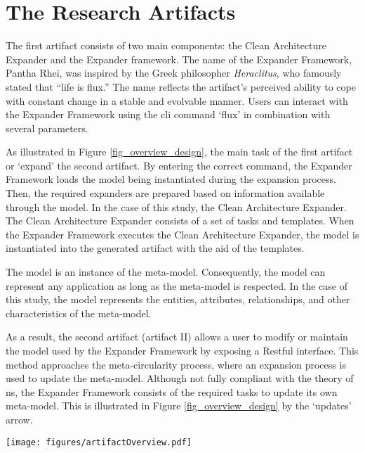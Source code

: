 \section{The Research Artifacts}

The first artifact consists of two main components: the Clean Architecture Expander and
the Expander framework. The name of the Expander Framework, Pantha Rhei, was inspired by
the Greek philosopher \emph{Heraclitus}, who famously stated that \enquote{life is flux.}
The name reflects the artifact's perceived ability to cope with constant change in a
stable and evolvable manner. Users can interact with the Expander Framework using the
\gls{cli} command \enquote*{flux} in combination with several parameters.

As illustrated in Figure \ref{fig_overview_design}, the main task of the first artifact or
\enquote*{expand} the second artifact. By entering the correct command, the Expander
Framework loads the model being instantiated during the expansion process. Then, the
required expanders are prepared based on information available through the model. In the
case of this study, the Clean Architecture Expander. The Clean Architecture Expander
consists of a set of tasks and templates. When the Expander Framework executes the Clean
Architecture Expander, the model is instantiated into the generated artifact with the aid
of the templates.

The model is an instance of the meta-model. Consequently, the model can represent any
application as long as the meta-model is respected. In the case of this study, the model
represents the entities, attributes, relationships, and other characteristics of the
meta-model.

As a result, the second artifact (artifact II) allows a user to modify or maintain the
model used by the Expander Framework by exposing a Restful interface. This method
approaches the meta-circularity process, where an expansion process is used to update the
meta-model. Although not fully compliant with the theory of \gls{ns}, the Expander
Framework consists of the required tasks to update its own meta-model. This is illustrated
in Figure \ref{fig_overview_design} by the \enquote*{updates} arrow.

\begin{figure*}[ht!]
    \centering
    \centerline{\texttt{[image: figures/artifactOverview.pdf]}}
    \caption[Schematic overview of the artifacts]{Schematic overview of the artifacts}
    \label{fig_overview_design}
  \end{figure*}







